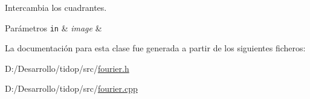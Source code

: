 Intercambia los cuadrantes. 


\begin{DoxyParams}[1]{Parámetros}
\mbox{\tt in}  & {\em image} & \\
\hline
\end{DoxyParams}


La documentación para esta clase fue generada a partir de los siguientes ficheros\+:\begin{DoxyCompactItemize}
\item 
D\+:/\+Desarrollo/tidop/src/\hyperlink{fourier_8h}{fourier.\+h}\item 
D\+:/\+Desarrollo/tidop/src/\hyperlink{fourier_8cpp}{fourier.\+cpp}\end{DoxyCompactItemize}

